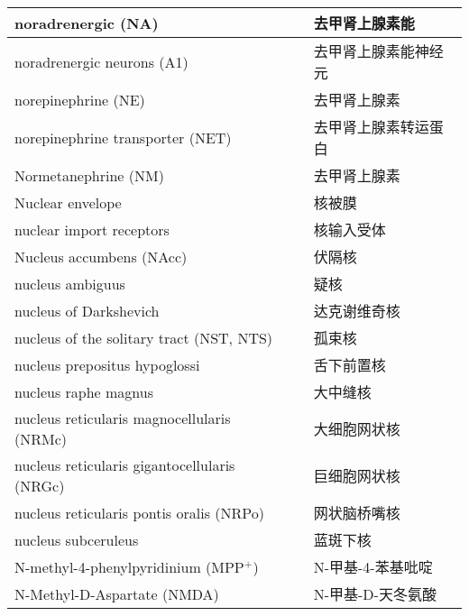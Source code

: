 \begin{longtable}{lll}
	\midrule
	noradrenergic (NA)   && 去甲肾上腺素能 \\
	
	\midrule
	noradrenergic neurons (A1)  && 去甲肾上腺素能神经元 \\
	
	\midrule
	norepinephrine (NE)   && 去甲肾上腺素 \\
	
	\midrule
	norepinephrine transporter (NET)   && 去甲肾上腺素转运蛋白 \\
	
	\midrule
	Normetanephrine (NM)  && 去甲肾上腺素 \\
	
	\midrule
	Nuclear envelope   && 核被膜  \\
	
	\midrule
	nuclear import receptors   && 核输入受体  \\
	
	\midrule
	Nucleus accumbens (NAcc)  && 伏隔核  \\
	
	\midrule
	nucleus ambiguus   && 疑核  \\
	
	\midrule
	nucleus of Darkshevich   && 达克谢维奇核  \\
	
	\midrule
	nucleus of the solitary tract (NST, NTS)  && 孤束核  \\
	
	\midrule
	nucleus prepositus hypoglossi   && 舌下前置核  \\
	
	\midrule
	nucleus raphe magnus   && 大中缝核  \\
	
	\midrule
	nucleus reticularis magnocellularis (NRMc)   && 大细胞网状核  \\
	
	\midrule
	nucleus reticularis gigantocellularis (NRGc)   && 巨细胞网状核  \\
	
	\midrule
	nucleus reticularis pontis oralis (NRPo)   && 网状脑桥嘴核  \\
	
	\midrule
	nucleus subceruleus   && 蓝斑下核  \\
	
	\midrule
	N-methyl-4-phenylpyridinium (MPP$^+$)  && N-甲基-4-苯基吡啶  \\
	
	\midrule
	N-Methyl-D-Aspartate (NMDA)   && N-甲基-D-天冬氨酸  \\
	

\end{longtable}
